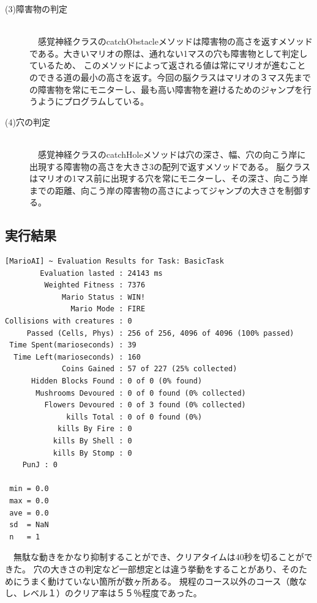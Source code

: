 \documentclass[a4j]{jarticle}
\begin{document}
\begin{description}
  \item[(3)障害物の判定]~\\
　感覚神経クラスのcatchObstacleメソッドは障害物の高さを返すメソッドである。大きいマリオの際は、通れない1マスの穴も障害物として判定しているため、
このメソッドによって返される値は常にマリオが進むことのできる道の最小の高さを返す。今回の脳クラスはマリオの３マス先までの障害物を常にモニターし、最も高い障害物を避けるためのジャンプを行うようにプログラムしている。
  	
  \item[(4)穴の判定]~\\
　感覚神経クラスのcatchHoleメソッドは穴の深さ、幅、穴の向こう岸に出現する障害物の高さを大きさ3の配列で返すメソッドである。
脳クラスはマリオの1マス前に出現する穴を常にモニターし、その深さ、向こう岸までの距離、向こう岸の障害物の高さによってジャンプの大きさを制御する。
 \end{description}
\subsection{実行結果}
\begin{verbatim}
[MarioAI] ~ Evaluation Results for Task: BasicTask
        Evaluation lasted : 24143 ms
         Weighted Fitness : 7376
             Mario Status : WIN!
               Mario Mode : FIRE
Collisions with creatures : 0
     Passed (Cells, Phys) : 256 of 256, 4096 of 4096 (100% passed)
 Time Spent(marioseconds) : 39
  Time Left(marioseconds) : 160
             Coins Gained : 57 of 227 (25% collected)
      Hidden Blocks Found : 0 of 0 (0% found)
       Mushrooms Devoured : 0 of 0 found (0% collected)
         Flowers Devoured : 0 of 3 found (0% collected)
              kills Total : 0 of 0 found (0%)
            kills By Fire : 0
           kills By Shell : 0
           kills By Stomp : 0
    PunJ : 0

 min = 0.0
 max = 0.0
 ave = 0.0
 sd  = NaN
 n   = 1
\end{verbatim}
　無駄な動きをかなり抑制することができ、クリアタイムは40秒を切ることができた。
穴の大きさの判定など一部想定とは違う挙動をすることがあり、そのためにうまく動けていない箇所が数ヶ所ある。
規程のコース以外のコース（敵なし、レベル１）のクリア率は５５％程度であった。
\end{document}
